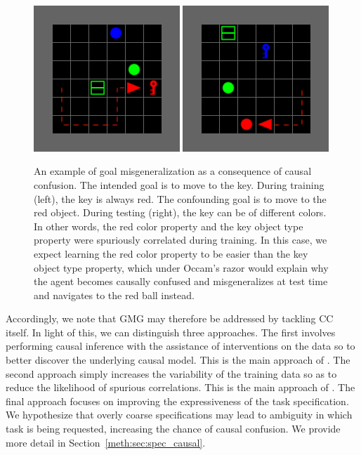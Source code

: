 \documentclass[../main.tex]{subfiles}
\begin{document}
\begin{figure}[t!]
	\centering
	\includegraphics[width=0.49\textwidth]{figures/red_key_path}
	\includegraphics[width=0.49\textwidth]{figures/blue_key_path}
	\caption[An example of goal misgeneralization.]{An example of goal misgeneralization as
		a consequence of causal confusion. The intended goal is to move to the key. During training
		(left), the key is always red. The confounding goal is to move to the red object. During testing
		(right), the key can be of different colors. In other words, the red color property and the key
		object type property were spuriously correlated during training. In this case, we expect learning
		the red color property to be easier than the key object type property, which under Occam's razor
		would explain why the agent becomes causally confused and misgeneralizes at test time and navigates
		to the red ball instead.}
	\label{fig:gmg-cc-example}
\end{figure}

Accordingly, we note that GMG may therefore be addressed by tackling CC itself. In light of this, we
can distinguish three approaches. The first involves performing causal inference with the assistance
of interventions on the data so to better discover the underlying causal model. This is the main
approach of \citet{de_haan_causal_2019}. The second approach simply increases the variability of the
training data so as to reduce the likelihood of spurious correlations. This is the main approach of
\citet{langosco_goal_2022}. The final approach focuses on improving the expressiveness of the task
specification. We hypothesize that overly coarse specifications may lead to ambiguity in which task
is being requested, increasing the chance of causal confusion. We provide more detail in
Section~\ref{meth:sec:spec_causal}.
\end{document}
